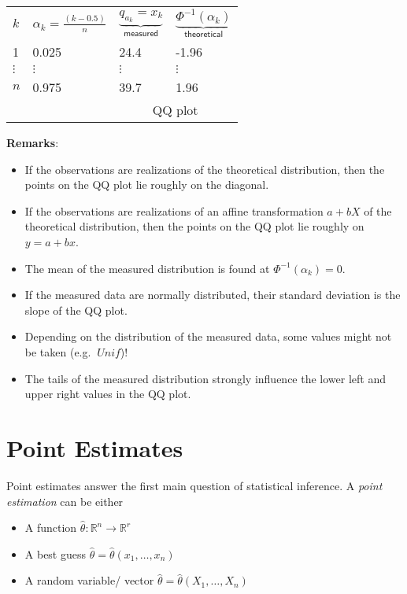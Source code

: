 \renewcommand{\arraystretch}{1.3}
\setlength{\oldtabcolsep}{\tabcolsep}\setlength\tabcolsep{12pt}
\begin{tabularx}{\linewidth}{@{}llll@{}}
    $k$      & $\alpha_k = \frac{(k-0.5)}{n}$ & $\underbrace{q_{a_k} = x_k}_{\textsf{measured}}$ & $\underbrace{\Phi^{-1}(\alpha_k)}_{\textsf{theoretical}}$ \\
    \cmidrule{2-4}
    1        & 0.025                          & 24.4                                             & -1.96                                                     \\
    $\vdots$ & $\vdots$                       & $\vdots$                                         & $\vdots$                                                  \\
    $n$      & 0.975                          & 39.7                                             & 1.96                                                      \\
    \cmidrule{3-4}
             &                                & \multicolumn{2}{c}{QQ plot}
\end{tabularx}
\renewcommand{\arraystretch}{1}
\setlength\tabcolsep{\oldtabcolsep}

\textbf{Remarks}:
\begin{itemize}
    \item If the observations are realizations of the theoretical distribution, then the points on the QQ plot lie roughly on the diagonal.
    \item If the observations are realizations of an affine transformation $a+bX$ of the theoretical distribution, then the points on the QQ plot lie roughly on $y = a+bx$.
    \item The mean of the measured distribution is found at $\Phi^{-1}(\alpha_k)=0$.
    \item If the measured data are normally distributed, their standard deviation is the slope of the QQ plot.
    \item Depending on the distribution of the measured data, some values might not be taken (e.g. $~Unif$)!
    \item The tails of the measured distribution strongly influence the lower left and upper right values in the QQ plot.
\end{itemize}

\section{Point Estimates}
Point estimates answer the first main question of statistical inference.
A \textit{point estimation} can be either
\begin{itemize}
    \item A function $\hat{\theta}: \mathbb{R}^n\to \mathbb{R}^r$
    \item A best guess $\hat{\theta} = \hat{\theta}(x_1,\ldots, x_n)$
    \item A random variable/ vector $\hat{\theta} = \hat{\theta}(X_1,\ldots, X_n)$
\end{itemize}


